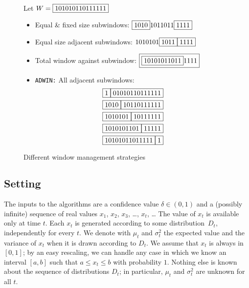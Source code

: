 \begin{figure}[ht]
Let $W= \fbox{101010110111111}$
\begin{itemize}
\item {Equal \& fixed size subwindows:} $ \fbox{1010}1011011\fbox{1111}$

\item {Equal size adjacent subwindows:} $ 1010101\fbox{1011}\fbox{1111}$ 

\item { Total window against subwindow:}
$ \fbox{\fbox{10101011011}1111}$


\item {{\tt ADWIN:}  All adjacent subwindows:}
\begin{eqnarray*}
\fbox{1} \fbox{01010110111111} \\
\fbox{1010} \fbox{10110111111} \\
\fbox{1010101} \fbox{10111111} \\
\fbox{1010101101} \fbox{11111} \\
\fbox{10101011011111} \fbox{1} \\
\end{eqnarray*}

\end{itemize}
\caption{Different window management strategies}
\label{Fig:wms}
\end{figure}
\ENDOMIT


\subsection{Setting}%

The inputs to the algorithms are a confidence value $\delta\in (0,1)$ 
and a (possibly infinite) sequence of real values 
$x_1$, $x_2$, $x_3$, \dots, $x_t$, \dots{} 
The value of $x_t$ is available only at time $t$.
Each $x_t$ is generated according to some distribution~$D_t$, 
independently for every $t$. 
We denote with $\mu_t$ and $\sigma^2_t$ 
the expected value and the variance of  $x_t$ when it is drawn according to $D_t$. 
We assume that $x_t$ is always in $[0,1]$; by an easy
rescaling, we can handle any case in which we know an interval 
$[a,b]$ such that $a \le x_t \le b$ with probability $1$. 
Nothing else is known about the sequence of 
distributions $D_t$; in particular, 
$\mu_t$ and $\sigma_t^2$ are unknown for all $t$. 

